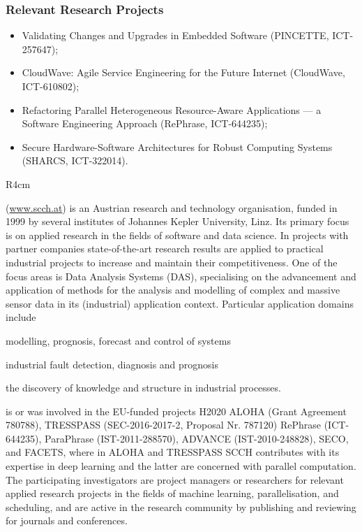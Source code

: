 \documentclass[a4paper,11pt]{article}
\begin{document}
\subsubsection*{Relevant Research Projects}
\begin{itemize}
\item
Validating Changes and Upgrades in Embedded Software (PINCETTE, ICT-257647);
\item
CloudWave: Agile Service Engineering for the Future Internet (CloudWave, ICT-610802);
\item
Refactoring Parallel Heterogeneous Resource-Aware Applications --- a Software Engineering Approach (RePhrase, ICT-644235);
\item
Secure Hardware-Software Architectures for Robust Computing Systems (SHARCS, ICT-322014).

\end{itemize}


\begin{wrapfigure}{R}{4cm}
\vspace{-2cm}
\hfill {}
\vspace{-1cm}
\end{wrapfigure}

\SCCH{} (\url{www.scch.at}) is an Austrian research and technology organisation, funded in 1999 by several institutes of Johannes Kepler University, Linz. Its primary focus is on applied research in the fields of software and data science. 
In projects with partner companies state-of-the-art research results are applied to practical industrial projects to increase and maintain their competitiveness. One of the focus areas is Data Analysis Systems (DAS), specialising on the advancement and application of methods for the analysis and modelling of complex and massive sensor data in its (industrial) application context. Particular application domains include
\begin{inparaenum}[a)]
\item modelling, prognosis, forecast and control of systems
\item industrial fault detection, diagnosis and prognosis
\item the discovery of knowledge and structure in industrial processes.
\end{inparaenum}
\SCCHshort{} is or was involved in the EU-funded projects H2020 ALOHA (Grant Agreement 780788), TRESSPASS (SEC-2016-2017-2, Proposal Nr. 787120) RePhrase (ICT-644235), ParaPhrase (IST-2011-288570), ADVANCE (IST-2010-248828), SECO, and FACETS, where in ALOHA and TRESSPASS SCCH contributes with its expertise in deep learning and the latter are concerned with parallel computation.  The participating investigators are project managers or researchers for relevant applied research projects in the fields of machine learning, parallelisation, and scheduling, and are active in the research community by publishing and reviewing for journals and conferences.
\end{document}
